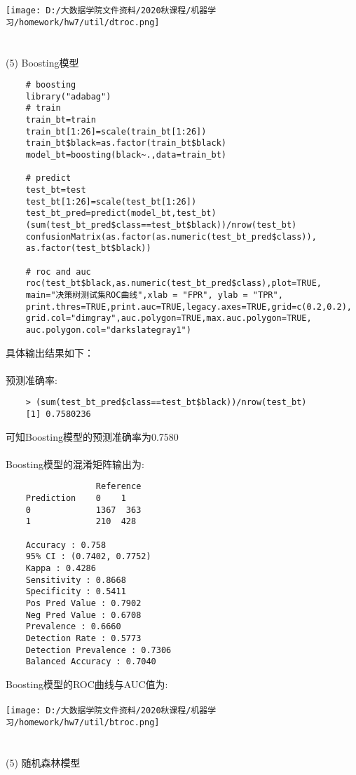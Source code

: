\documentclass[]{article}
\begin{document}
\texttt{[image: D:/大数据学院文件资料/2020秋课程/机器学习/homework/hw7/util/dtroc.png]}\\\\\\
(5) Boosting模型
\begin{lstlisting}
	# boosting
	library("adabag")
	# train
	train_bt=train 
	train_bt[1:26]=scale(train_bt[1:26])
	train_bt$black=as.factor(train_bt$black)
	model_bt=boosting(black~.,data=train_bt)
	
	# predict
	test_bt=test
	test_bt[1:26]=scale(test_bt[1:26])  
	test_bt_pred=predict(model_bt,test_bt)
	(sum(test_bt_pred$class==test_bt$black))/nrow(test_bt)
	confusionMatrix(as.factor(as.numeric(test_bt_pred$class)), 
	as.factor(test_bt$black))
	
	# roc and auc
	roc(test_bt$black,as.numeric(test_bt_pred$class),plot=TRUE,
	main="决策树测试集ROC曲线",xlab = "FPR", ylab = "TPR",
	print.thres=TRUE,print.auc=TRUE,legacy.axes=TRUE,grid=c(0.2,0.2),
	grid.col="dimgray",auc.polygon=TRUE,max.auc.polygon=TRUE,
	auc.polygon.col="darkslategray1")
\end{lstlisting} 
具体输出结果如下：\\\\
预测准确率:
\begin{lstlisting}
	> (sum(test_bt_pred$class==test_bt$black))/nrow(test_bt)
	[1] 0.7580236
\end{lstlisting}
可知Boosting模型的预测准确率为0.7580\\\\
Boosting模型的混淆矩阵输出为:
\begin{lstlisting}
	              Reference
	Prediction    0    1
	0             1367  363
	1             210  428
	
	Accuracy : 0.758           
	95% CI : (0.7402, 0.7752)   
	Kappa : 0.4286          
	Sensitivity : 0.8668          
	Specificity : 0.5411          
	Pos Pred Value : 0.7902          
	Neg Pred Value : 0.6708          
	Prevalence : 0.6660          
	Detection Rate : 0.5773          
	Detection Prevalence : 0.7306          
	Balanced Accuracy : 0.7040            
\end{lstlisting}
Boosting模型的ROC曲线与AUC值为:\\\\
\texttt{[image: D:/大数据学院文件资料/2020秋课程/机器学习/homework/hw7/util/btroc.png]}\\\\\\
(5) 随机森林模型
\end{document}
